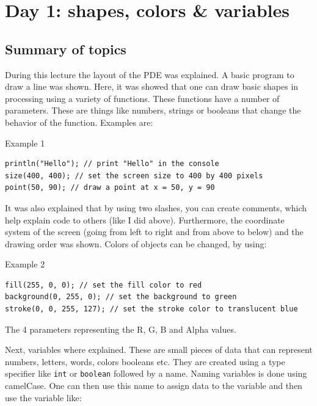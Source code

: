 \chapter{Day 1: shapes, colors \& variables}

\section{Summary of topics}
During this lecture the layout of the PDE was explained. A basic program to draw a line was shown. Here, it was showed that one can draw basic shapes in processing using a variety of functions. These functions have a number of parameters. These are things like numbers, strings or booleans that change the behavior of the function. Examples are:

\begin{codebox}{Example 1}
    \begin{lstlisting}
println("Hello"); // print "Hello" in the console
size(400, 400); // set the screen size to 400 by 400 pixels
point(50, 90); // draw a point at x = 50, y = 90
    \end{lstlisting}
\end{codebox}

It was also explained that by using two slashes, you can create comments, which help explain code to others (like I did above). Furthermore, the coordinate system of the screen (going from left to right and from above to below) and the drawing order was shown. Colors of objects can be changed, by using:

\begin{codebox}{Example 2}
    \begin{lstlisting}
fill(255, 0, 0); // set the fill color to red
background(0, 255, 0); // set the background to green
stroke(0, 0, 255, 127); // set the stroke color to translucent blue
    \end{lstlisting}
\end{codebox}

The 4 parameters representing the R, G, B and Alpha values.

Next, variables where explained. These are small pieces of data that can represent numbers, letters, words, colors booleans etc. They are created using a type specifier like \texttt{int} or \texttt{boolean} followed by a name. Naming variables is done using camelCase. One can then use this name to assign data to the variable and then use the variable like:

